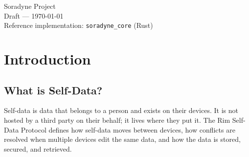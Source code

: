 \documentclass[11pt, letterpaper]{article}
\begin{document}
\begin{titlepage}

\vfill

{\large Soradyne Project}\\[0.3cm]
{\color{gray} Draft --- \today}\\[0.3cm]
{\small Reference implementation: \texttt{soradyne\_core} (Rust)}

\end{titlepage}

\tableofcontents
\newpage

\section{Introduction}
\label{sec:intro}

\subsection{What is Self-Data?}

Self-data is data that belongs to a person and exists on their devices. It is not hosted
by a third party on their behalf; it lives where they put it. The Rim Self-Data Protocol
defines how self-data moves between devices, how conflicts are resolved when multiple
devices edit the same data, and how the data is stored, secured, and retrieved.
\end{document}
